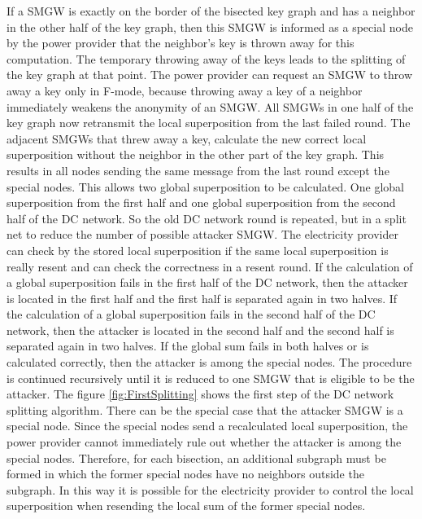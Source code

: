 If a SMGW is exactly on the border of the bisected key graph and has a neighbor in the other half of the key graph, then this SMGW is informed as a special node by the power provider that the neighbor's key is thrown away for this computation. The temporary throwing away of the keys leads to the splitting of the key graph at that point. The power provider can request an SMGW to throw away a key only in F-mode, because throwing away a key of a neighbor immediately weakens the anonymity of an SMGW. All SMGWs in one half of the key graph now retransmit the local superposition from the last failed round. The adjacent SMGWs that threw away a key, calculate the new correct local superposition without the neighbor in the other part of the key graph. This results in all nodes sending the same message from the last round except the special nodes. This allows two global superposition to be calculated. One global superposition from the first half and one global superposition from the second half of the DC network. So the old DC network round is repeated, but in a split net to reduce the number of possible attacker SMGW. The electricity provider can check by the stored local superposition if the same local superposition is really resent and can check the correctness in a resent round. 
If the calculation of a global superposition fails in the first half of the DC network, then the attacker is located in the first half and the first half is separated again in two halves. If the calculation of a global superposition fails in the second half of the DC network, then the attacker is located in the second half and the second half is separated again in two halves. 
If the global sum fails in both halves or is calculated correctly, then the attacker is among the special nodes.
The procedure is continued recursively until it is reduced to one SMGW that is eligible to be the attacker. The figure \ref{fig:FirstSplitting} shows the first step of the DC network splitting algorithm.
There can be the special case that the attacker SMGW is a special node. Since the special nodes send a recalculated local superposition, the power provider cannot immediately rule out whether the attacker is among the special nodes. Therefore, for each bisection, an additional subgraph must be formed in which the former special nodes have no neighbors outside the subgraph. In this way it is possible for the electricity provider to control the local superposition when resending the local sum of the former special nodes.
